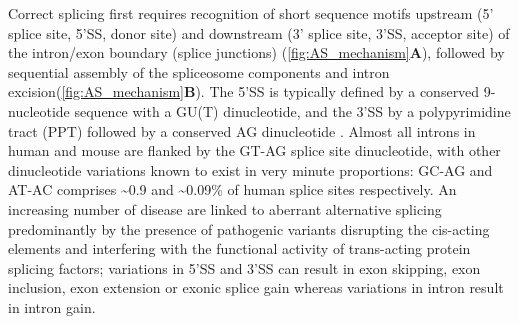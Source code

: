 Correct splicing first requires recognition of short sequence motifs upstream (5' splice site, 5'SS, donor site) and downstream (3' splice site, 3'SS, acceptor site) of the intron/exon boundary (splice junctions) (\cref{fig:AS_mechanism}\textbf{A}),  followed by sequential assembly of the spliceosome components and intron excision\cite{Herzel2017}(\cref{fig:AS_mechanism}\textbf{B}). The 5'SS is typically defined by a conserved 9-nucleotide sequence with a GU(T) dinucleotide, and the 3'SS by a polypyrimidine tract (PPT) followed by a conserved AG dinucleotide \cite{Will2011}. Almost all introns in human and mouse are flanked by the GT-AG splice site dinucleotide\cite{Sheth2006}, with other dinucleotide variations known to exist in very minute proportions: GC-AG and AT-AC comprises \textasciitilde0.9 and \textasciitilde0.09\% of human splice sites respectively\cite{Parada2014}. An increasing number of disease are linked to aberrant alternative splicing predominantly by the presence of pathogenic variants disrupting the cis-acting elements and interfering with the functional activity of trans-acting protein splicing factors; variations in 5'SS and 3'SS can result in exon skipping, exon inclusion, exon extension or exonic splice gain whereas variations in intron result in intron gain.


